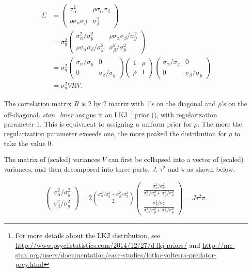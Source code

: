 \begin{align}
	\Sigma &=
	\left(\begin{matrix}
		\sigma_\alpha^2 & \rho\sigma_\alpha \sigma_\beta \\
		\rho\sigma_\alpha\sigma_\beta&\sigma_\beta^2
	\end{matrix} \right)\\ &=
	\sigma_y^2\left(\begin{matrix}
		\sigma_\alpha^2/\sigma_y^2 & \rho\sigma_\alpha \sigma_\beta/\sigma_y^2 \\
		\rho\sigma_\alpha\sigma_\beta/\sigma_y^2 & \sigma_\beta^2/\sigma_y^2
	\end{matrix} \right)\\ &=
	\sigma_y^2\left(\begin{matrix}
		\sigma_\alpha/\sigma_y & 0 \\
		0&\sigma_\beta/\sigma_y
	\end{matrix} \right)
	\left(\begin{matrix}
		1 & \rho\\
		\rho&1
	\end{matrix} \right)
	\left(\begin{matrix}
		\sigma_\alpha/\sigma_y & 0 \\
		0&\sigma_\beta/\sigma_y
	\end{matrix} \right)\\
	&= \sigma_y^2VRV.
\end{align}


The correlation matrix $R$ is 2 by 2 matrix with 1's on the diagonal and $\rho$'s on the off-diagonal. \textit{stan\_lmer} assigns it an LKJ \footnote{For more details about the LKJ distribution, see \url{http://www.psychstatistics.com/2014/12/27/d-lkj-priors/} and \url{http://mc-stan.org/users/documentation/case-studies/lotka-volterra-predator-prey.html}} prior (\cite{lewandowski2009generating}), with regularization parameter 1.  This is equivalent to assigning a uniform prior for $\rho$.  The more the regularization parameter exceeds one, the more peaked the distribution for $\rho$ to take the value 0.

The matrix of (scaled) variances $V$ can first be collapsed into a vector of (scaled) variances, and then decomposed into three parts, $J$, $\tau^2$ and $\pi$ as shown below.

\begin{align}
	\left(\begin{matrix}
		\sigma_\alpha^2/\sigma_y^2 \\
		\sigma_\beta^2/\sigma_y^2
	\end{matrix} \right) =
	2\left(\frac{\sigma_\alpha^2/\sigma_y^2 + \sigma_\beta^2/\sigma_y^2}{2}\right)\left(\begin{matrix}
		\frac{\sigma_\alpha^2/\sigma_y^2}{\sigma_\alpha^2/\sigma_y^2 + \sigma_\beta^2/\sigma_y^2} \\
		\frac{\sigma_\beta^2/\sigma_y^2}{\sigma_\alpha^2/\sigma_y^2 + \sigma_\beta^2/\sigma_y^2}
	\end{matrix} \right)=
	J\tau^2 \pi.
\end{align}



